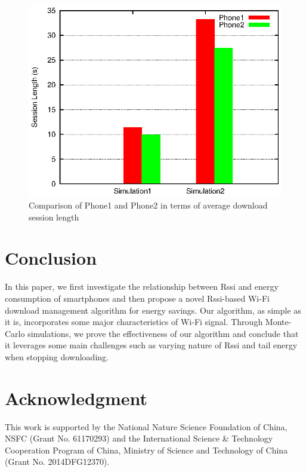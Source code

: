 \documentclass[journal]{IEEEtran}
\begin{document}
\begin{figure}
\centering
\includegraphics[scale=0.85]{comparison_session_length.eps}
\caption{Comparison of Phone1 and Phone2 in terms of average download session length}
\end{figure}
\section{Conclusion} 
In this paper, we first investigate the relationship between Rssi and energy consumption of smartphones
and then propose a novel Rssi-based Wi-Fi download management algorithm for energy savings.
Our algorithm, as simple as it is, incorporates some major characteristics of Wi-Fi signal.
Through Monte-Carlo simulations, we prove the effectiveness of our algorithm
and conclude that it leverages some main challenges such as varying nature of Rssi and
tail energy when stopping downloading. 
\section*{Acknowledgment}

This work is supported by the National Nature Science Foundation of China, NSFC (Grant No. 61170293) 
and the International Science \& Technology Cooperation Program of China, 
Ministry of Science and Technology of China (Grant No. 2014DFG12370).
\end{document}
